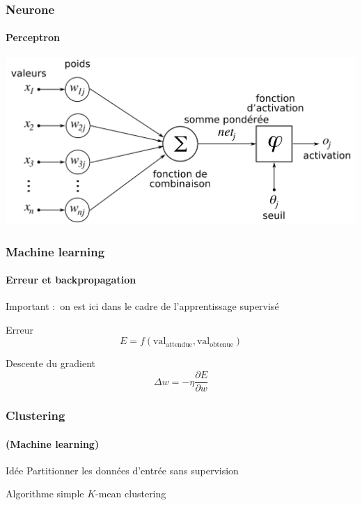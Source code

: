 \documentclass[]{beamer}
\begin{document}
\begin{frame}
  \frametitle{Neurone}
  \framesubtitle{Perceptron}
  \begin{center}
    \includegraphics[scale=0.18]{perceptron.png}
  \end{center}
\end{frame}

\begin{frame}
  \frametitle{Machine learning}
  \framesubtitle{Erreur et backpropagation}

  \alert{Important :}~on est ici dans le cadre de l'apprentissage supervisé

  \begin{block}{Erreur}
    \[
      E = f(\text{val}_{\text{attendue}}, \text{val}_{\text{obtenue}})
    \]
  \end{block}

  \begin{block}{Descente du gradient}
    \[
      \Delta w = -\eta \frac{\partial E}{\partial w}
    \]
  \end{block}
\end{frame}

\begin{frame}
  \frametitle{Clustering}
  \framesubtitle{(Machine learning)}

  \begin{block}{Idée}
    Partitionner les données d'entrée sans supervision
  \end{block}

  \begin{alertblock}{Algorithme simple}
    $K$-mean clustering
  \end{alertblock}
\end{frame}
\end{document}
